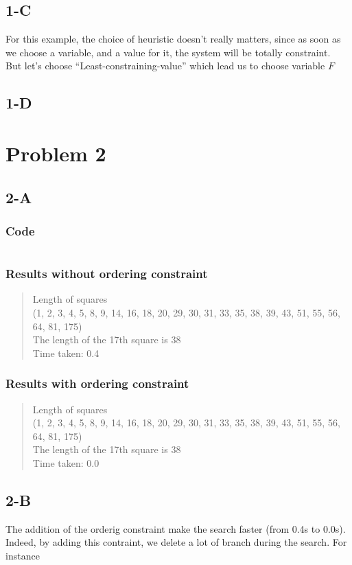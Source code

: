 \documentclass{article}
\begin{document}
        \subsection{1-C}
            For this example, the choice of heuristic doesn't really matters, since as soon as we choose a variable, and a value for it, the system will be totally constraint.\\
            But let's choose ``Least-constraining-value'' which lead us to choose variable $F$
        \subsection{1-D}
    \newpage
    \section{Problem 2}
        \subsection{2-A}
            \subsubsection{Code}
                \inputminted[linenos=true]{python}{square.py}
            \subsubsection{Results without ordering constraint}
                \begin{quote}
                    Length of squares\\
                    (1, 2, 3, 4, 5, 8, 9, 14, 16, 18, 20, 29, 30, 31, 33, 35, 38, 39, 43, 51, 55, 56, 64, 81, 175)\\
                    The length of the 17th square is 38\\
                    Time taken: 0.4
                \end{quote}
            \subsubsection{Results with ordering constraint}
                \begin{quote}
                    Length of squares\\
                    (1, 2, 3, 4, 5, 8, 9, 14, 16, 18, 20, 29, 30, 31, 33, 35, 38, 39, 43, 51, 55, 56, 64, 81, 175)\\
                    The length of the 17th square is 38\\
                    Time taken: 0.0
                \end{quote}


        \subsection{2-B}
            The addition of the orderig constraint make the search faster (from 0.4s to 0.0s).\\
            Indeed, by adding this contraint, we delete a lot of branch during the search. For instance
\end{document}
